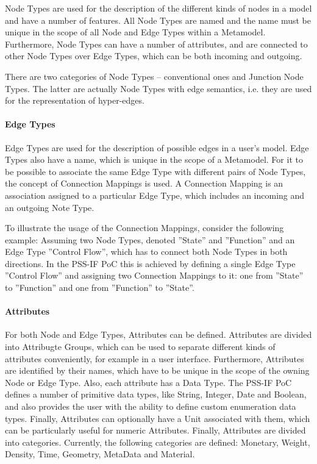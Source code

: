 Node Types are used for the description of the different kinds of nodes in a model and have a number of features. All Node Types are named and the name must be unique in the scope of all Node and Edge Types within a Metamodel. Furthermore, Node Types can have a number of attributes, and are connected to other Node Types over Edge Types, which can be both incoming and outgoing.

There are two categories of Node Types -- conventional ones and Junction Node Types. The latter are actually Node Types with edge semantics, i.e. they are used for the representation of hyper-edges.

\paragraph{Edge Types}

Edge Types are used for the description of possible edges in a user's model. Edge Types also have a name, which is unique in the scope of a Metamodel. For it to be possible to associate the same Edge Type with different pairs of Node Types, the concept of Connection Mappings is used. A Connection Mapping is an association assigned to a particular Edge Type, which includes an incoming and an outgoing Note Type.

To illustrate the usage of the Connection Mappings, consider the following example: Assuming two Node Types, denoted ''State'' and ''Function'' and an Edge Type ''Control Flow'', which has to connect both Node Types in both directions. In the PSS-IF PoC this is achieved by defining a single Edge Type ''Control Flow'' and assigning two Connection Mappings to it: one from ''State'' to ''Function'' and one from ''Function'' to ''State''.

\paragraph{Attributes}

For both Node and Edge Types, Attributes can be defined. Attributes are divided into Attribugte Groups, which can be used to separate different kinds of attributes conveniently, for example in a user interface. Furthermore, Attributes are identified by their names, which have to be unique in the scope of the owning Node or Edge Type. Also, each attribute has a Data Type. The PSS-IF PoC defines a number of primitive data types, like String, Integer, Date and Boolean, and also provides the user with the ability to define custom enumeration data types. Finally, Attributes can optionally have a Unit associated with them, which can be particularly useful for numeric Attributes. Finally, Attributes are divided into categories. Currently, the following categories are defined: Monetary, Weight, Density, Time, Geometry, MetaData and Material.

